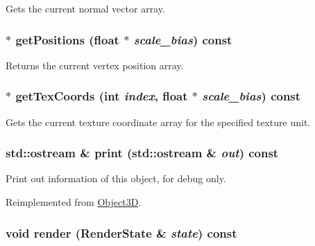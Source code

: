 Gets the current normal vector array. \hypertarget{classm3g_1_1VertexBuffer_5ca059361f9f834dd00b5d595bf3df0b}{
\subsubsection[{getPositions}]{ $\ast$ getPositions (float $\ast$ {\em scale\_\-bias}) const}}
\label{classm3g_1_1VertexBuffer_5ca059361f9f834dd00b5d595bf3df0b}


Returns the current vertex position array. \hypertarget{classm3g_1_1VertexBuffer_9015840c09da0691c31a8aab5e09404a}{
\subsubsection[{getTexCoords}]{ $\ast$ getTexCoords (int {\em index}, \/  float $\ast$ {\em scale\_\-bias}) const}}
\label{classm3g_1_1VertexBuffer_9015840c09da0691c31a8aab5e09404a}


Gets the current texture coordinate array for the specified texture unit. \hypertarget{classm3g_1_1VertexBuffer_6fea17fa1532df3794f8cb39cb4f911f}{
\subsubsection[{print}]{\setlength{\rightskip}{0pt plus 5cm}std::ostream \& print (std::ostream \& {\em out}) const}}
\label{classm3g_1_1VertexBuffer_6fea17fa1532df3794f8cb39cb4f911f}


Print out information of this object, for debug only. 

Reimplemented from \hyperlink{classm3g_1_1Object3D_6fea17fa1532df3794f8cb39cb4f911f}{Object3D}.\hypertarget{classm3g_1_1VertexBuffer_8babc8a79b78615da51161e94029eea9}{
\subsubsection[{render}]{\setlength{\rightskip}{0pt plus 5cm}void render ({\bf RenderState} \& {\em state}) const}}
\label{classm3g_1_1VertexBuffer_8babc8a79b78615da51161e94029eea9}


